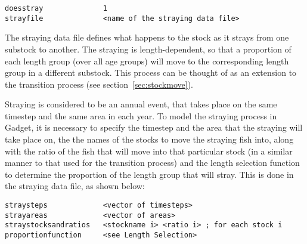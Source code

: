 \documentclass [a4paper, 10pt]{book}
\begin{document}
{\small\begin{verbatim}
doesstray              1
strayfile              <name of the straying data file>
\end{verbatim}}

The straying data file defines what happens to the stock as it strays from one substock to another.  The straying is length-dependent, so that a proportion of each length group (over all age groups) will move to the corresponding length group in a different substock.  This process can be thought of as an extension to the transition process (see section~\ref{sec:stockmove}).

\bigskip
Straying is considered to be an annual event, that takes place on the same timestep and the same area in each year.  To model the straying process in Gadget, it is necessary to specify the timestep and the area that the straying will take place on, the the names of the stocks to move the straying fish into, along with the ratio of the fish that will move into that particular stock (in a similar manner to that used for the transition process) and the length selection function to determine the proportion of the length group that will stray.  This is done in the straying data file, as shown below:

{\small\begin{verbatim}
straysteps             <vector of timesteps>
strayareas             <vector of areas>
straystocksandratios   <stockname i> <ratio i> ; for each stock i
proportionfunction     <see Length Selection>
\end{verbatim}}


\end{document}
